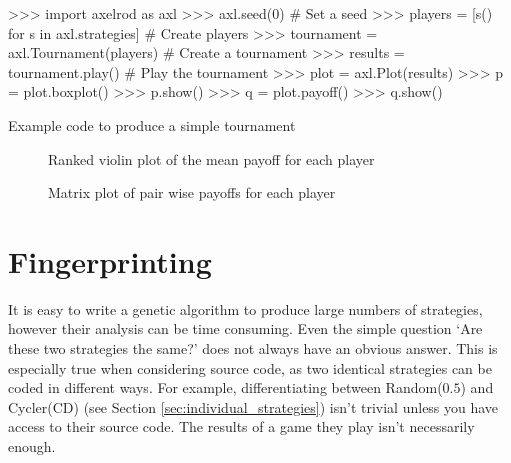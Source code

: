 \begin{listing}[htbp!]
    \begin{ExampleCode}
        >>> import axelrod as axl
        >>> axl.seed(0)  # Set a seed
        >>> players = [s() for s in axl.strategies]  # Create players
        >>> tournament = axl.Tournament(players)  # Create a tournament
        >>> results = tournament.play()  # Play the tournament
        >>> plot = axl.Plot(results)
        >>> p = plot.boxplot()
        >>> p.show()
        >>> q = plot.payoff()
        >>> q.show()
    \end{ExampleCode}
    \caption{Example code to produce a simple tournament}
    \label{lst:tournament}
\end{listing}

\begin{figure}
\begin{center}
\caption{Ranked violin plot of the mean payoff for each player}
\label{fig:violinplot}
\end{center}

\begin{center}
\caption{Matrix plot of pair wise payoffs for each player}
\label{fig:matrixplot}
\end{center}
\end{figure}


\section{Fingerprinting}\label{sec:fingerprinting}
It is easy to write a genetic algorithm to produce large numbers of strategies, however their analysis can be time consuming.
Even the simple question `Are these two strategies the same?' does not always have an obvious answer.
This is especially true when considering source code, as two identical strategies can be coded in different ways.
For example, differentiating between Random($0.5$) and Cycler(CD) (see Section \ref{sec:individual_strategies}) isn't trivial unless you have access to their source code.
The results of a game they play isn't necessarily enough.

